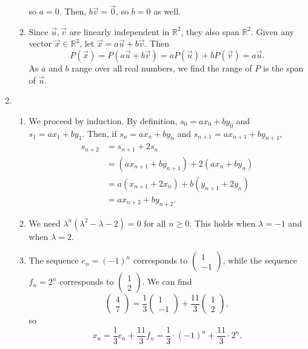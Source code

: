 \begin{enumerate}
\begin{enumerate}
so $a = 0$. Then, $b\vec{v} = \vec{0}$, so $b = 0$ as well.
\item Since $\vec{u},\vec{v}$ are linearly independent in $\mathbb{R}^2$, they also span $\mathbb{R}^2$. Given any vector $\vec{x}\in\mathbb{R}^2$, let $\vec{x} = a\vec{u} + b\vec{v}$. Then
\begin{equation*}
P(\vec{x}) = P(a\vec{u} + b\vec{v}) = aP(\vec{u}) + bP(\vec{v}) = a\vec{u}.
\end{equation*}
As $a$ and $b$ range over all real numbers, we find the range of $P$ is the span of $\vec{u}$.
\end{enumerate}
\item \begin{enumerate}
\item We proceed by induction. By definition, $s_0 = ax_0 + by_0$ and $s_1 = ax_1 + by_1$. Then, if $s_n = ax_n + by_n$ and $s_{n + 1} = ax_{n + 1} + by_{n + 1}$,
\begin{align*}
s_{n + 2} &= s_{n + 1} + 2s_n \\
&= (ax_{n + 1} + by_{n + 1}) + 2(ax_n + by_n) \\
&= a(x_{n + 1} + 2x_n) + b(y_{n + 1} + 2y_n) \\
&= ax_{n + 2} + by_{n + 2}.
\end{align*}
\item We need $\lambda^n(\lambda^2 - \lambda - 2) = 0$ for all $n\geq 0$. This holds when $\lambda = -1$ and when $\lambda = 2$.
\item The sequence $e_n = (-1)^n$ corresponds to $\begin{pmatrix} 1 \\ -1 \end{pmatrix}$, while the sequence $f_n = 2^n$ corresponds to $\begin{pmatrix} 1 \\ 2 \end{pmatrix}$. We can find
\begin{equation*}
\begin{pmatrix} 4 \\ 7 \end{pmatrix} = \frac{1}{3}\begin{pmatrix} 1 \\ -1 \end{pmatrix} + \frac{11}{3}\begin{pmatrix} 1 \\ 2 \end{pmatrix},
\end{equation*}
so
\begin{equation*}
x_n = \frac{1}{3}e_n + \frac{11}{3}f_n = \frac{1}{3}\cdot (-1)^n + \frac{11}{3}\cdot 2^n.
\end{equation*}
\end{enumerate}
\end{enumerate}